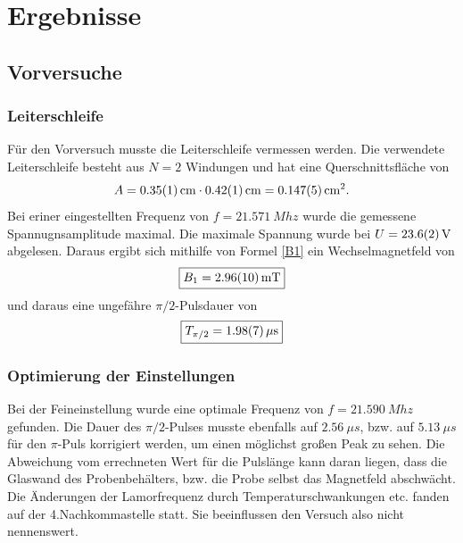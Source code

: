 \documentclass[12pt,a4paper]{article}
\begin{document}
\newpage
\section{Ergebnisse}

\subsection{Vorversuche}

\subsubsection{Leiterschleife}

Für den Vorversuch musste die Leiterschleife vermessen werden. Die verwendete Leiterschleife besteht aus $N=2$ Windungen und hat eine Querschnittsfläche von 
\begin{equation*}
A =  \SI{0.35\pm 0.01}{cm} \cdot \SI{0.42\pm 0.01}{cm} = \SI{0.147\pm 0.005}{cm^2}.
\end{equation*}
Bei eriner eingestellten Frequenz von $f = \SI{21.571}{Mhz}$ wurde die gemessene Spannugnsamplitude maximal. Die maximale Spannung wurde bei $U =\SI{23.6\pm 0.2}{V}$ abgelesen. Daraus ergibt sich mithilfe von Formel \ref{B1} ein Wechselmagnetfeld von 
\begin{equation*}
\boxed{B_1 = \SI{2.96\pm 0.10}{mT}}
\end{equation*}
und daraus eine ungefähre $\pi /2$-Pulsdauer von
\begin{equation*}
\boxed{T_{\pi /2} = \SI{1.98\pm 0.07}{\mu s}}
\end{equation*}
\subsubsection{Optimierung der Einstellungen}
Bei der Feineinstellung wurde eine optimale Frequenz von  $f = \SI{21.590}{Mhz}$ gefunden. Die Dauer des $\pi / 2 $-Pulses musste ebenfalls auf $\SI{2.56}{\mu s}$, bzw. auf $\SI{5.13}{\mu s}$ für den $\pi$-Puls korrigiert werden, um einen möglichst großen Peak zu sehen. Die Abweichung vom errechneten Wert für die Pulslänge kann daran liegen, dass die Glaswand des Probenbehälters, bzw. die Probe selbst das Magnetfeld abschwächt.\\
Die Änderungen der Lamorfrequenz durch Temperaturschwankungen etc. fanden auf der 4.Nachkommastelle statt. Sie beeinflussen den Versuch also nicht nennenswert.
\end{document}
